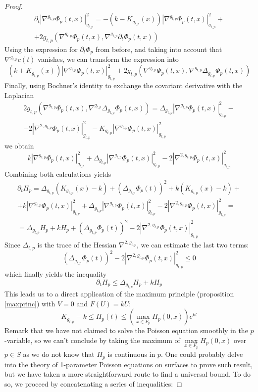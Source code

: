 \documentclass[10pt,a4paper]{amsart}
\begin{document}
\begin{proof}
\begin{multline*}
        \partial_t |\nabla^{g_{t,p}}\Phi_p(t,x)|_{g_{t,p}}^2=-(k-K_{g_{t,p}}(x))|\nabla^{g_{t,p}}\Phi_p(t,x)|_{g_{t,p}}^2+ \\+2g_{t,p}(\nabla^{g_{t,p}}\Phi_p(t,x), \nabla^{g_{t,p}} \partial_t\Phi_p(t,x))
    \end{multline*}
    Using the expression for $\partial_t \Phi_p$ from before, and taking into account that $\nabla^{g_{t,p}} c(t)$ vanishes, we can transform the expression into
    $$(k+K_{g_{t,p}}(x))|\nabla^{g_{t,p}}\Phi_p(t,x)|_{g_{t,p}}^2 +2g_{t,p}(\nabla^{g_{t,p}}\Phi_p(t,x), \nabla^{g_{t,p}} \Delta_{g_{t,p}}\Phi_p(t,x))$$
    Finally, using Bochner's identity to exchange the covariant derivative with the Laplacian
    \begin{multline*}
        2g_{t,p}(\nabla^{g_{t,p}}\Phi_p(t,x), \nabla^{g_{t,p}} \Delta_{g_{t,p}}\Phi_p(t,x))=\Delta_{g_{t,p}}|\nabla^{g_{t,p}}\Phi_p(t,x)|_{g_{t,p}}^2-\\-2|\nabla^{2,g_{t,p}}\Phi_p(t,x)|_{g_{t,p}}^2 -K_{g_{t,p}}|\nabla^{g_{t,p}}\Phi_p(t,x)|_{g_{t,p}}^2
    \end{multline*}
    we obtain 
    $$k|\nabla^{g_{t,p}}\Phi_p(t,x)|_{g_{t,p}}^2+\Delta_{g_{t,p}}|\nabla^{g_{t,p}}\Phi_p(t,x)|_{g_{t,p}}^2-2|\nabla^{2,g_{t,p}}\Phi_p(t,x)|_{g_{t,p}}^2$$
    Combining both calculations yields 
    \begin{multline*}
        \partial_t H_p=\Delta_{g_{t,p}}(K_{g_{t,p}}(x)-k) + (\Delta_{g_{t,p}} \Phi_p(t))^2+k(K_{g_{t,p}}(x)-k) +\\+k|\nabla^{g_{t,p}}\Phi_p(t,x)|_{g_{t,p}}^2+\Delta_{g_{t,p}}|\nabla^{g_{t,p}}\Phi_p(t,x)|_{g_{t,p}}^2-2|\nabla^{2,g_{t,p}}\Phi_p(t,x)|_{g_{t,p}}^2 = \\= \Delta_{g_{t,p}}H_p+kH_p+(\Delta_{g_{t,p}} \Phi_p(t))^2-2|\nabla^{2,g_{t,p}}\Phi_p(t,x)|_{g_{t,p}}^2
    \end{multline*}
    Since $\Delta_{t,p}$ is the trace of the Hessian $\nabla^{2,g_{t,p}}$, we can estimate the last two terms\thinspace:
    $$(\Delta_{g_{t,p}} \Phi_p(t))^2-2|\nabla^{2,g_{t,p}}\Phi_p(t,x)|_{g_{t,p}}^2 \leq 0$$
    which finally yields the inequality
    $$\partial_t H_p \leq \Delta_{g_{t,p}}H_p+kH_p$$
    This leads us to a direct application of the maximum principle (proposition \ref{maxprinc}) with $V=0$ and $F(U)=kU$\thinspace:
    $$K_{g_{t,p}}-k\leq H_p(t) \leq (\underset{x\in F_p}{\max}H_p(0,x)) e^{kt}$$
    Remark that we have not claimed to solve the Poisson equation smoothly in the $p$-variable, so we can't conclude by taking the maximum of $\underset{x\in F_p}{\max}H_p(0,x)$ over $p\in S$ as we do not know that $H_p$ is continuous in $p$. One could probably delve into the theory of 1-parameter Poisson equations on surfaces to prove such result, but we have taken a more straightforward route to find a universal bound. To do so, we proceed by concatenating a series of inequalities\thinspace:

\end{proof}
\end{document}
